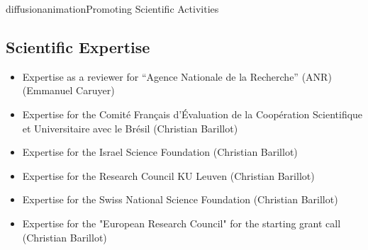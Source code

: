 \documentclass{ra2018}
\begin{document}
\begin{module}{diffusion}{animation}{Promoting Scientific Activities}
\subsection{Scientific Expertise}
\begin{itemize}
    \item Expertise as a reviewer for ``Agence Nationale de la Recherche'' (ANR) (Emmanuel Caruyer)
    \item Expertise for the Comité Français d'Évaluation de la Coopération Scientifique et Universitaire avec le Brésil (Christian Barillot)
    \item Expertise for the Israel Science Foundation  (Christian Barillot)
    \item Expertise for the Research Council KU Leuven  (Christian Barillot)
    \item Expertise for the Swiss National Science Foundation  (Christian Barillot)
    \item Expertise for the "European Research Council" for the starting grant call (Christian Barillot)
\end{itemize}

  
\end{module}
\end{document}
